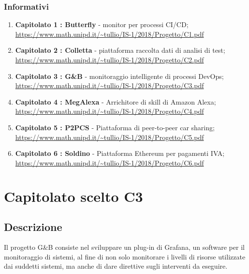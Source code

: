          \subsubsection{Informativi}
            \begin{enumerate}
                \item \textbf{Capitolato 1 : Butterfly} - monitor per processi CI/CD; \newline 	\url{ https://www.math.unipd.it/~tullio/IS-1/2018/Progetto/C1.pdf}
			    \item \textbf{Capitolato 2 : Colletta} - piattaforma raccolta dati di analisi di test; \newline   \url{https://www.math.unipd.it/~tullio/IS-1/2018/Progetto/C2.pdf}
                \item \textbf{Capitolato 3 : G\&B} - monitoraggio intelligente di processi DevOps; \newline \url{https://www.math.unipd.it/~tullio/IS-1/2018/Progetto/C3.pdf}
                \item \textbf{Capitolato 4 : MegAlexa} - Arrichitore di skill di Amazon Alexa; \newline \url{https://www.math.unipd.it/~tullio/IS-1/2018/Progetto/C4.pdf}
                \item \textbf{Capitolato 5 : P2PCS} - Piattaforma di peer-to-peer car sharing; \newline  \url{https://www.math.unipd.it/~tullio/IS-1/2018/Progetto/C5.pdf}
                \item \textbf{Capitolato 6 : Soldino} - Piattaforma Ethereum per pagamenti IVA; \newline \url{https://www.math.unipd.it/~tullio/IS-1/2018/Progetto/C6.pdf}
            \end{enumerate}




			
\newpage
    \section{Capitolato scelto C3}
        \subsection{Descrizione}
            Il progetto G\&B consiste nel sviluppare un plug-in di Grafana, un software per il monitoraggio di sistemi, al fine di non solo monitorare i livelli di risorse utilizzate dai suddetti sistemi, ma anche di dare direttive sugli interventi da eseguire.
